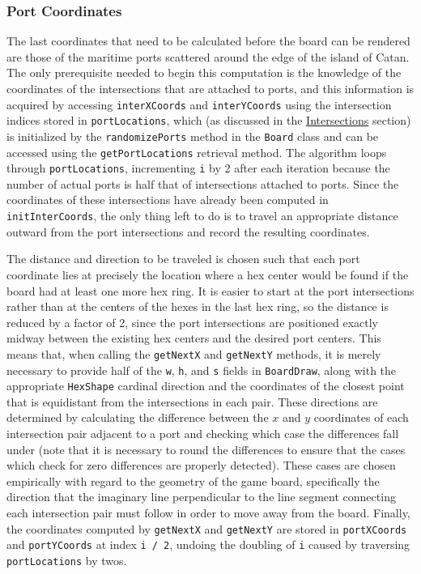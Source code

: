 \documentclass[pageno]{jpaper}
\begin{document}
\begin{doublespacing}
\hypertarget{sec:port_coordinates}{}
\subsubsection{Port Coordinates}

The last coordinates that need to be calculated before the board can be rendered are those of the maritime ports scattered around the edge of the island of Catan. The only prerequisite needed to begin this computation is the knowledge of the coordinates of the intersections that are attached to ports, and this information is acquired by accessing \lstinline$interXCoords$ and \lstinline$interYCoords$ using the intersection indices stored in \lstinline$portLocations$, which (as discussed in the \hyperlink{sec:intersections}{Intersections} section) is initialized by the \lstinline$randomizePorts$ method in the \lstinline$Board$ class and can be accessed using the \lstinline$getPortLocations$ retrieval method. The algorithm loops through \lstinline$portLocations$, incrementing \lstinline$i$ by 2 after each iteration because the number of actual ports is half that of intersections attached to ports. Since the coordinates of these intersections have already been computed in \lstinline$initInterCoords$, the only thing left to do is to travel an appropriate distance outward from the port intersections and record the resulting coordinates. 

The distance and direction to be traveled is chosen such that each port coordinate lies at precisely the location where a hex center would be found if the board had at least one more hex ring. It is easier to start at the port intersections rather than at the centers of the hexes in the last hex ring, so the distance is reduced by a factor of 2, since the port intersections are positioned exactly midway between the existing hex centers and the desired port centers. This means that, when calling the \lstinline$getNextX$ and \lstinline$getNextY$ methods, it is merely necessary to provide half of the \lstinline$w$, \lstinline$h$, and \lstinline$s$ fields in \lstinline$BoardDraw$, along with the appropriate \lstinline$HexShape$ cardinal direction and the coordinates of the closest point that is equidistant from the intersections in each pair. These directions are determined by calculating the difference between the $x$ and $y$ coordinates of each intersection pair adjacent to a port and checking which case the differences fall under (note that it is necessary to round the differences to ensure that the cases which check for zero differences are properly detected). These cases are chosen empirically with regard to the geometry of the game board, specifically the direction that the imaginary line perpendicular to the line segment connecting each intersection pair must follow in order to move away from the board. Finally, the coordinates computed by \lstinline$getNextX$ and \lstinline$getNextY$ are stored in \lstinline$portXCoords$ and \lstinline$portYCoords$ at index \lstinline$i / 2$, undoing the doubling of \lstinline$i$ caused by traversing \lstinline$portLocations$ by twos.


\end{doublespacing}
\end{document}
